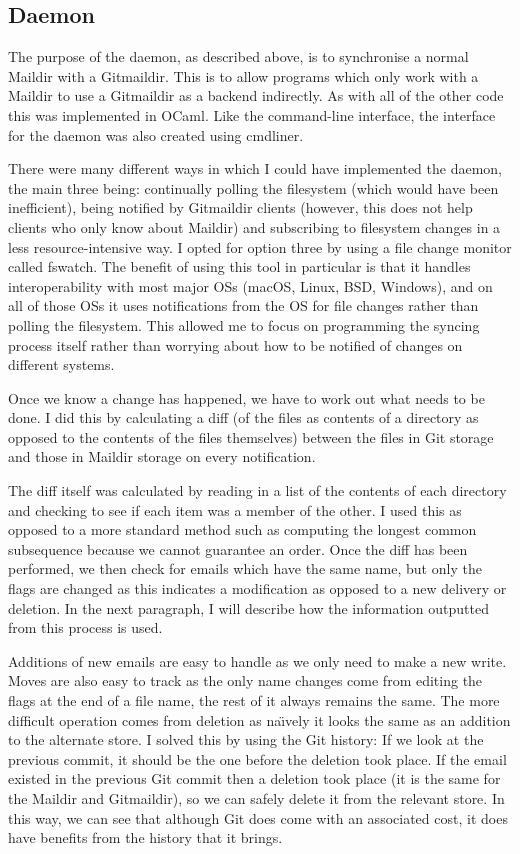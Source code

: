 \subsection{Daemon}

The purpose of the daemon, as described above, is to synchronise a normal Maildir with a Gitmaildir. This is to allow programs which only work with a Maildir to use a Gitmaildir as a backend indirectly. As with all of the other code this was implemented in OCaml. Like the command-line interface, the interface for the daemon was also created using cmdliner.

There were many different ways in which I could have implemented the daemon, the main three being: continually polling the filesystem (which would have been inefficient), being notified by Gitmaildir clients (however, this does not help clients who only know about Maildir) and subscribing to filesystem changes in a less resource-intensive way. I opted for option three by using a file change monitor called fswatch\cite{code_fswatch}. The benefit of using this tool in particular is that it handles interoperability with most major OSs (macOS, Linux, BSD, Windows), and on all of those OSs it uses notifications from the OS for file changes rather than polling the filesystem. This allowed me to focus on programming the syncing process itself rather than worrying about how to be notified of changes on different systems.

Once we know a change has happened, we have to work out what needs to be done. I did this by calculating a diff (of the files as contents of a directory as opposed to the contents of the files themselves) between the files in Git storage and those in Maildir storage on every notification.

The diff itself was calculated by reading in a list of the contents of each directory and checking to see if each item was a member of the other. I used this as opposed to a more standard method such as computing the longest common subsequence because we cannot guarantee an order. Once the diff has been performed, we then check for emails which have the same name, but only the flags are changed as this indicates a modification as opposed to a new delivery or deletion. In the next paragraph, I will describe how the information outputted from this process is used.

Additions of new emails are easy to handle as we only need to make a new write. Moves are also easy to track as the only name changes come from editing the flags at the end of a file name, the rest of it always remains the same. The more difficult operation comes from deletion as na\"{\i}vely it looks the same as an addition to the alternate store. I solved this by using the Git history: If we look at the previous commit, it should be the one before the deletion took place. If the email existed in the previous Git commit then a deletion took place (it is the same for the Maildir and Gitmaildir), so we can safely delete it from the relevant store. In this way, we can see that although Git does come with an associated cost, it does have benefits from the history that it brings.

